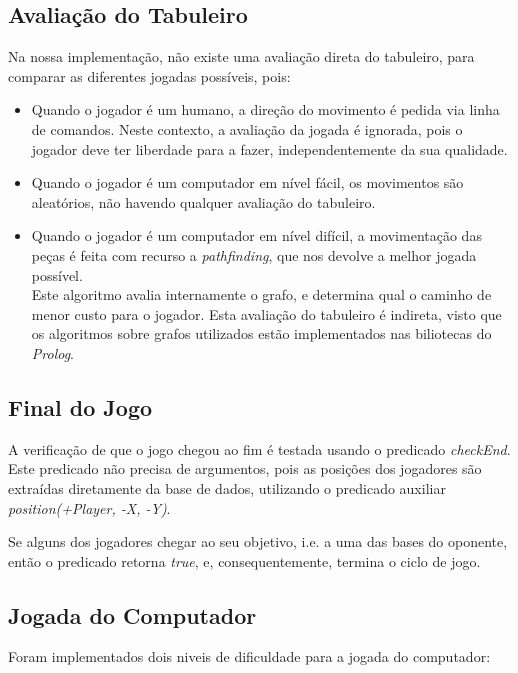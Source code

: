 \documentclass[a4paper]{article}
\begin{document}
\subsection{Avaliação do Tabuleiro} Na nossa implementação, não existe uma avaliação direta do tabuleiro, para comparar as diferentes jogadas possíveis, pois:
\begin{itemize}
	\item Quando o jogador é um humano, a direção do movimento é pedida via linha de comandos. Neste contexto, a avaliação da jogada é ignorada, pois o jogador deve ter liberdade para a fazer, independentemente da sua qualidade.
	
	\item Quando o jogador é um computador em nível fácil, os movimentos são aleatórios, não havendo qualquer avaliação do tabuleiro.
	
	\item Quando o jogador é um computador em nível difícil, a movimentação das peças é feita com recurso a \textit{pathfinding}, que nos devolve a melhor jogada possível. \\
Este algoritmo avalia internamente o grafo, e determina qual o caminho de menor custo para o jogador. Esta avaliação do tabuleiro é indireta, visto que os algoritmos sobre grafos utilizados estão implementados nas biliotecas do \textit{Prolog}.
\end{itemize}


\newpage
\subsection{Final do Jogo} A verificação de que o jogo chegou ao fim é testada usando o predicado \mbox{\textit{checkEnd}}. Este predicado não precisa de argumentos, pois as posições dos jogadores são extraídas diretamente da base de dados, utilizando o predicado auxiliar \textit{position(+Player, -X, -Y)}. \par
Se alguns dos jogadores chegar ao seu objetivo, i.e. a uma das bases do oponente, então o predicado retorna \textit{true}, e, consequentemente, termina o ciclo de jogo.




\subsection{Jogada do Computador} 

Foram implementados dois niveis de dificuldade para a jogada do computador:
\end{document}
